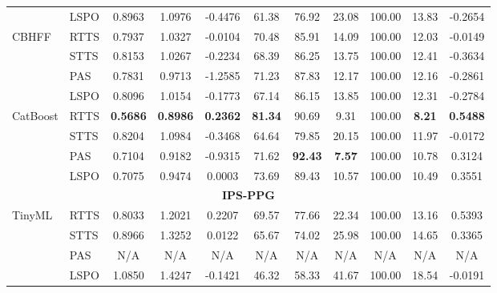 \documentclass{article}
\begin{document}
{\begin{longtable}{llccccccccc}
& LSPO
& 0.8963 & 1.0976 & -0.4476
& 61.38 & 76.92 & 23.08 & 100.00 & 13.83 & -0.2654 \\

\addlinespace

CBHFF
& RTTS
& 0.7937 & 1.0327 & -0.0104
& 70.48 & 85.91 & 14.09 & 100.00 & 12.03 & -0.0149 \\

& STTS
& 0.8153 & 1.0267 & -0.2234
& 68.39 & 86.25 & 13.75 & 100.00 & 12.41 & -0.3634 \\

& PAS
& 0.7831 & 0.9713 & -1.2585
& 71.23 & 87.83 & 12.17 & 100.00 & 12.16 & -0.2861 \\

& LSPO
& 0.8096 & 1.0154 & -0.1773
& 67.14 & 86.15 & 13.85 & 100.00 & 12.31 & -0.2784 \\

\addlinespace

CatBoost
& RTTS
& \textbf{0.5686} & \textbf{0.8986} & \textbf{0.2362}
& \textbf{81.34} & 90.69 & 9.31 & 100.00 & \textbf{8.21} & \textbf{0.5488} \\

& STTS
& 0.8204 & 1.0984 & -0.3468
& 64.64 & 79.85 & 20.15 & 100.00 & 11.97 & -0.0172 \\

& PAS
& 0.7104 & 0.9182 & -0.9315
& 71.62 & \textbf{92.43} & \textbf{7.57} & 100.00 & 10.78 & 0.3124 \\

& LSPO
& 0.7075 & 0.9474 & 0.0003
& 73.69 & 89.43 & 10.57 & 100.00 & 10.49 & 0.3551 \\



\midrule
\multicolumn{11}{c}{\textbf{IPS-PPG}} \\
\midrule

TinyML
& RTTS
& 0.8033 & 1.2021 & 0.2207
& 69.57 & 77.66 & 22.34 & 100.00 & 13.16 & 0.5393 \\

& STTS
& 0.8966 & 1.3252 & 0.0122
& 65.67 & 74.02 & 25.98 & 100.00 & 14.65 & 0.3365 \\

& PAS
& N/A & N/A & N/A & N/A
& N/A & N/A & N/A & N/A & N/A \\

& LSPO
& 1.0850 & 1.4247 & -0.1421
& 46.32 & 58.33 & 41.67 & 100.00 & 18.54 & -0.0191 \\


\end{longtable}}
\end{document}
